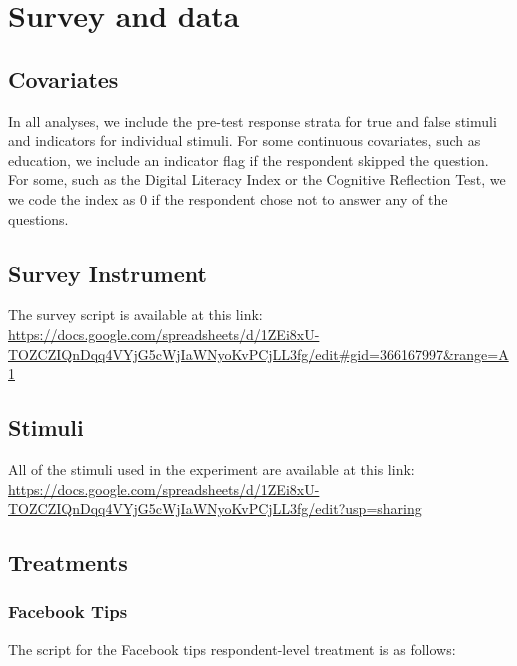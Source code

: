 \documentclass[letterpaper, 12pt, parskip=full,]{scrartcl}
\begin{document}
\section{Survey and data}\label{appendix:data}
\subsection{Covariates}\label{appendix:covariates}


In all analyses, we include the pre-test response strata for true and false stimuli and indicators for individual stimuli. 
For some continuous covariates, such as education, we include an indicator flag if the respondent skipped the question. For some, such as the Digital Literacy Index or the Cognitive Reflection Test, we we code the index as 0 if the respondent chose not to answer any of the questions. 

\subsection{Survey Instrument}\label{appendix:survey}%
The survey script is available at this link:\\
\url{https://docs.google.com/spreadsheets/d/1ZEi8xU-TOZCZIQnDqq4VYjG5cWjIaWNyoKvPCjLL3fg/edit#gid=366167997&range=A1}

\subsection{Stimuli}\label{appendis:stimuli}
All of the stimuli used in the experiment are available at this link:\\
\url{https://docs.google.com/spreadsheets/d/1ZEi8xU-TOZCZIQnDqq4VYjG5cWjIaWNyoKvPCjLL3fg/edit?usp=sharing}


\subsection{Treatments}

\subsubsection{Facebook Tips}\label{sec:fbtips}
The script for the Facebook tips respondent-level treatment is as follows:
\end{document}
